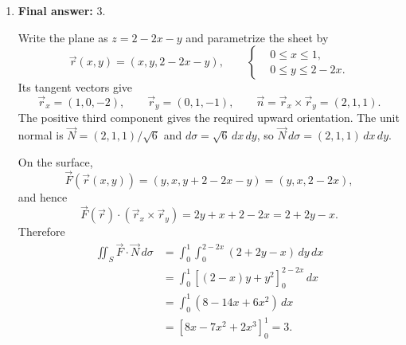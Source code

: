 \documentclass[12pt]{exam}
\begin{document}
\begin{enumerate}
\begin{minipage}[c]{0.53\linewidth}
\medskip
An outward normal, pointing away from the $z$-axis, is
\[
\vec n=(2x,2y,-1).
\]
It has a negative $z$-component. Thus the projection is an annulus with
\emph{downward} orientation: the outer circle is \textbf{clockwise}
and the inner circle is \textbf{counterclockwise}, viewed from above.

\medskip
To check the normal directly, use
\[
\vec r(r,\theta)=(r\cos\theta,r\sin\theta,r^2),
\qquad1\le r\le2.
\]
Here $0\le\theta\le2\pi$. The outward cross product is
\[
\vec r_\theta\times\vec r_r
=(2r^2\cos\theta,2r^2\sin\theta,-r).
\]
The displayed boundary parametrizations have the required directions
and the correct heights. The shaded annulus $D$ is the $xy$-projection
of the curved surface $S$.
\end{minipage}\hfill
\begin{minipage}[c]{0.43\linewidth}
\centering
{}
\end{minipage}

\newpage

\item \textbf{Final answer:} $\boxed{3}$.

Write the plane as $z=2-2x-y$ and parametrize the sheet by
\[
\vec r(x,y)=(x,y,2-2x-y),\qquad
\left\{
\begin{aligned}
&0\le x\le1,\\
&0\le y\le2-2x.
\end{aligned}
\right.
\]
Its tangent vectors give
\[
\vec r_x=(1,0,-2),\qquad \vec r_y=(0,1,-1),\qquad
\vec n=\vec r_x\times\vec r_y=(2,1,1).
\]
The positive third component gives the required upward orientation.
The unit normal is $\vec N=(2,1,1)/\sqrt6$ and
$d\sigma=\sqrt6\,dx\,dy$, so $\vec N\,d\sigma=(2,1,1)\,dx\,dy$.

On the surface,
\[
\vec F(\vec r(x,y))=(y,x,y+2-2x-y)=(y,x,2-2x),
\]
and hence
\[
\vec F(\vec r)\cdot(\vec r_x\times\vec r_y)
=2y+x+2-2x=2+2y-x.
\]
Therefore
\[
\begin{aligned}
\iint_S\vec F\cdot\vec N\,d\sigma
&=\int_0^1\int_0^{2-2x}(2+2y-x)\,dy\,dx\\
&=\int_0^1\left[(2-x)y+y^2\right]_0^{2-2x}\,dx\\
&=\int_0^1(8-14x+6x^2)\,dx\\
&=\left[8x-7x^2+2x^3\right]_0^1=3.
\end{aligned}
\]


\end{enumerate}
\end{document}
